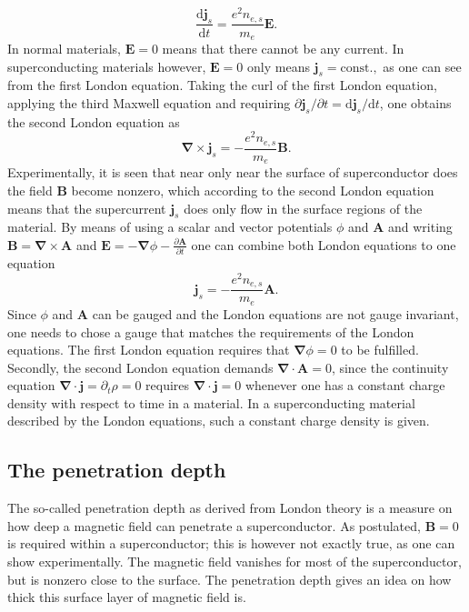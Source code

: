 \documentclass{report}
\numberwithin{tm}{section}
\newcommand\vect[1]{\ensuremath{\bm{#1}}}
\begin{document}
\begin{equation}
	\frac{\mathrm{d}\vect{j}_s}{\mathrm{d}t} = \frac{e^2 n_{e,s}}{m_e}\vect{E}.
\end{equation} In normal materials, $\vect{E} = 0$ means that there cannot be any current. In superconducting materials however, $\vect{E} = 0$ only means $\vect{j}_s = \text{const.},$ as one can see from the first London equation. Taking the curl of the first London equation, applying the third Maxwell equation and requiring $\partial \vect{j}_s/\partial t = \mathrm{d}\vect{j}_s/\mathrm{d}t$, one obtains the second London equation as \begin{equation}
\vect{\nabla}\times \vect{j}_s = -\frac{e^2n_{e,s}}{m_e}\vect{B}.
\end{equation} Experimentally, it is seen that near only near the surface of superconductor does the field $\vect{B}$ become nonzero, which according to the second London equation means that the supercurrent $\vect{j}_s$ does only flow in the surface regions of the material. By means of using a scalar and vector potentials $\phi$ and $\vect{A}$ and writing $\vect{B} = \vect{\nabla}\times \vect{A}$ and $\vect{E} = -\vect{\nabla}\phi - \frac{\partial \vect{A}}{\partial t}$ one can combine both London equations to one equation \begin{equation}\label{eq:supercurrent_density_classical_london}
\vect{j}_s = -\frac{e^2n_{e,s}}{m_e}\vect{A}.
\end{equation} Since $\phi$ and $\vect{A}$ can be gauged and the London equations are not gauge invariant, one needs to chose a gauge that matches the requirements of the London equations. The first London equation requires that $\vect{\nabla}\phi=0$ to be fulfilled. Secondly, the second London equation demands $\vect{\nabla}\cdot \vect{A} = 0$, since the continuity equation $\vect{\nabla}\cdot \vect{j} = \partial_t \rho = 0$ requires $\vect{\nabla}\cdot \vect{j} = 0$ whenever one has a constant charge density with respect to time in a material. In a superconducting material described by the London equations, such a constant charge density is given.

\subsection{The penetration depth}
The so-called penetration depth as derived from London theory is a measure on how deep a magnetic field can penetrate a superconductor. As postulated, $\vect{B} =0$ is required within a superconductor; this is however not exactly true, as one can show experimentally. The magnetic field vanishes for most of the superconductor, but is nonzero close to the surface. The penetration depth gives an idea on how thick this surface layer of magnetic field is.
\end{document}
